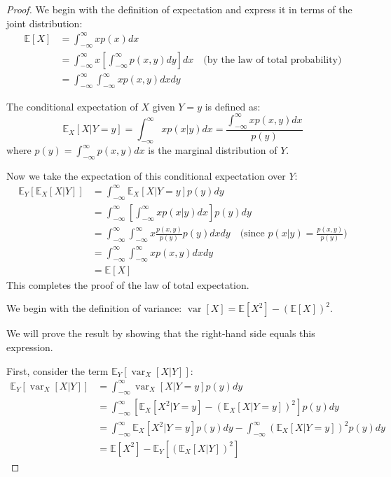 \documentclass[../main.tex]{subfiles}
\begin{document}
\begin{proof}
We begin with the definition of expectation and express it in terms of the joint distribution:
\begin{align*}
\mathbb{E}[X] &= \int_{-\infty}^{\infty} x p(x) dx \\
&= \int_{-\infty}^{\infty} x \left[ \int_{-\infty}^{\infty} p(x,y) dy \right] dx \quad \text{(by the law of total probability)} \\
&= \int_{-\infty}^{\infty} \int_{-\infty}^{\infty} x p(x,y) dx dy
\end{align*}

The conditional expectation of $X$ given $Y=y$ is defined as:
\begin{equation*}
\mathbb{E}_{X}[X|Y=y] = \int_{-\infty}^{\infty} x p(x|y) dx = \frac{\int_{-\infty}^{\infty} x p(x,y) dx}{p(y)}
\end{equation*}
where $p(y) = \int_{-\infty}^{\infty} p(x,y) dx$ is the marginal distribution of $Y$.

Now we take the expectation of this conditional expectation over $Y$:
\begin{align*}
\mathbb{E}_{Y}[\mathbb{E}_{X}[X|Y]] &= \int_{-\infty}^{\infty} \mathbb{E}_{X}[X|Y=y] p(y) dy \\
&= \int_{-\infty}^{\infty} \left[ \int_{-\infty}^{\infty} x p(x|y) dx \right] p(y) dy \\
&= \int_{-\infty}^{\infty} \int_{-\infty}^{\infty} x \frac{p(x,y)}{p(y)} p(y) dx dy \quad \text{(since } p(x|y) = \frac{p(x,y)}{p(y)} \text{)} \\
&= \int_{-\infty}^{\infty} \int_{-\infty}^{\infty} x p(x,y) dx dy \\
&= \mathbb{E}[X]
\end{align*}
This completes the proof of the law of total expectation.

We begin with the definition of variance: $\operatorname{var}[X] = \mathbb{E}[X^2] - (\mathbb{E}[X])^2$.

We will prove the result by showing that the right-hand side equals this expression.

First, consider the term $\mathbb{E}_{Y}[\operatorname{var}_{X}[X|Y]]$:
\begin{align*}
\mathbb{E}_{Y}[\operatorname{var}_{X}[X|Y]] &= \int_{-\infty}^{\infty} \operatorname{var}_{X}[X|Y=y] p(y) dy \\
&= \int_{-\infty}^{\infty} \left[ \mathbb{E}_{X}[X^2|Y=y] - (\mathbb{E}_{X}[X|Y=y])^2 \right] p(y) dy \\
&= \int_{-\infty}^{\infty} \mathbb{E}_{X}[X^2|Y=y] p(y) dy - \int_{-\infty}^{\infty} (\mathbb{E}_{X}[X|Y=y])^2 p(y) dy \\
&= \mathbb{E}[X^2] - \mathbb{E}_{Y}[(\mathbb{E}_{X}[X|Y])^2]
\end{align*}


\end{proof}
\end{document}

